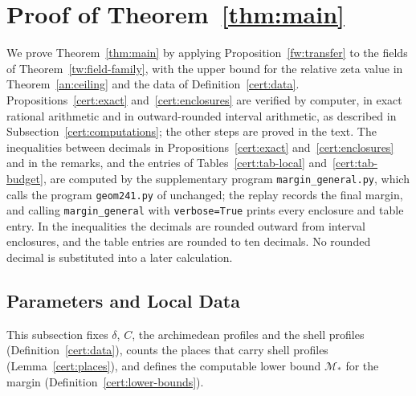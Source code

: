 \section{Proof of Theorem~\ref{thm:main}}
\label{sec:certificate}

We prove Theorem~\ref{thm:main} by applying
Proposition~\ref{fw:transfer} to the fields of
Theorem~\ref{tw:field-family}, with the upper bound for the relative
zeta value in Theorem~\ref{an:ceiling} and the data of
Definition~\ref{cert:data}. Propositions~\ref{cert:exact}
and~\ref{cert:enclosures} are verified by computer, in exact rational
arithmetic and in outward-rounded interval arithmetic, as described in
Subsection~\ref{cert:computations}; the other steps are proved in the
text. The inequalities between decimals in
Propositions~\ref{cert:exact} and~\ref{cert:enclosures} and in the remarks,
and the entries of Tables~\ref{cert:tab-local} and~\ref{cert:tab-budget},
are computed by the supplementary program
\texttt{margin\_general.py}, which calls the program \texttt{geom241.py} of
\cite{Naslund04273} unchanged; the replay records the final margin, and
calling \texttt{margin\_general} with \texttt{verbose=True} prints every
enclosure and table entry. In the inequalities the decimals are rounded
outward from interval enclosures, and the table entries are rounded to
ten decimals. No rounded decimal is substituted into a later calculation.

\subsection{Parameters and Local Data}

This subsection fixes $\delta$, $C$, the archimedean profiles and the shell
profiles (Definition~\ref{cert:data}), counts the places that carry shell
profiles (Lemma~\ref{cert:places}), and defines the computable lower bound
$\mathcal M_*$ for the margin (Definition~\ref{cert:lower-bounds}).


